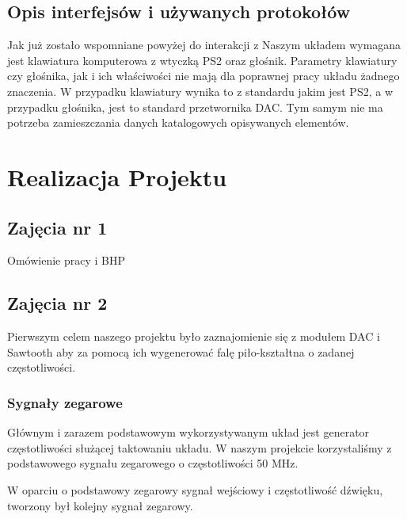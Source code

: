 \documentclass[11pt]{report}
\begin{document}
\subsection{Opis interfejsów i używanych protokołów}
	Jak już zostało wspomniane powyżej do interakcji z Naszym układem wymagana jest klawiatura komputerowa z wtyczką PS2 oraz głośnik. Parametry klawiatury czy głośnika, jak i ich właściwości nie mają dla poprawnej pracy układu żadnego znaczenia. W przypadku klawiatury wynika to z standardu jakim jest PS2, a w przypadku głośnika, jest to standard przetwornika DAC. Tym samym nie ma potrzeba zamieszczania danych katalogowych opisywanych elementów.
	
\section{Realizacja Projektu}
\subsection{Zajęcia nr 1}
\par Omówienie pracy i BHP

\subsection{Zajęcia nr 2}

\par Pierwszym celem naszego projektu było zaznajomienie się z modułem DAC i Sawtooth aby za pomocą ich wygenerować falę piło-kształtna o zadanej częstotliwości.

\subsubsection{Sygnały zegarowe}
    \par  Głównym i zarazem podstawowym wykorzystywanym układ jest generator częstotliwości służącej taktowaniu układu. 
    W naszym projekcie korzystaliśmy z podstawowego sygnału zegarowego o częstotliwości 50 MHz. 

    \par W oparciu o podstawowy zegarowy sygnał wejściowy i częstotliwość dźwięku, tworzony był kolejny sygnał zegarowy.
\newpage
\end{document}
